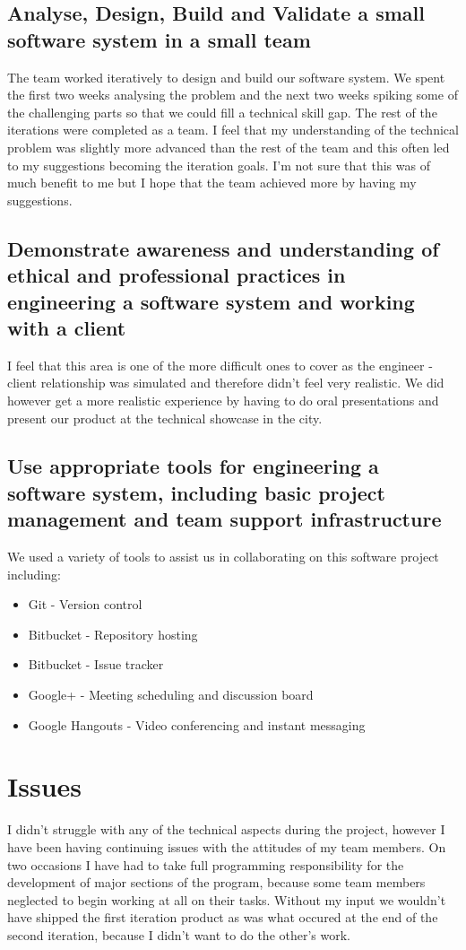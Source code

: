 \documentclass{article}
\begin{document}
\subsection{Analyse, Design, Build and Validate a small software system in a small team}
The team worked iteratively to design and build our software system. We spent the first two weeks analysing the problem and the next two weeks spiking some of the challenging parts so that we could fill a technical skill gap. The rest of the iterations were completed as a team. I feel that my understanding of the technical problem was slightly more advanced than the rest of the team and this often led to my suggestions becoming the iteration goals. I'm not sure that this was of much benefit to me but I hope that the team achieved more by having my suggestions.

\subsection{Demonstrate awareness and understanding of ethical and professional practices in engineering a software system and working with a client}
I feel that this area is one of the more difficult ones to cover as the engineer - client relationship was simulated and therefore didn't feel very realistic. We did however get a more realistic experience by having to do oral presentations and present our product at the technical showcase in the city.

\subsection{Use appropriate tools for engineering a software system, including basic project management and team support infrastructure}
We used a variety of tools to assist us in collaborating on this software project including:
\begin{itemize}
	\item{Git - Version control}
	\item{Bitbucket - Repository hosting}
	\item{Bitbucket - Issue tracker}
	\item{Google+ - Meeting scheduling and discussion board}
	\item{Google Hangouts - Video conferencing and instant messaging}
\end{itemize}

\section{Issues}
I didn't struggle with any of the technical aspects during the project, however I have been having continuing issues with the attitudes of my team members. On two occasions I have had to take full programming responsibility for the development of major sections of the program, because some team members neglected to begin working at all on their tasks. Without my input we wouldn't have shipped the first iteration product as was what occured at the end of the second iteration, because I didn't want to do the other's work. 
\end{document}

